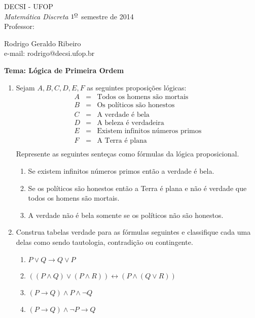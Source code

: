 \documentclass[11pt,a4paper]{report}
\begin{document}
 
 \hfill DECSI - UFOP \\
{\it Matem\'atica Discreta}
 \hfill $\mbox{1}^{\mbox{\underline{o}}}$ semestre de 2014 \\
Professor: \parbox[t]{14cm}{Rodrigo Geraldo Ribeiro \\
                     e-mail: rodrigo@decsi.ufop.br}
 
 \hfill {\bf Tema: L\'ogica de
  Primeira Ordem}
 
\vspace*{3mm}
\begin{enumerate}
   \item Sejam $A,B,C,D,E,F$ as seguintes proposi\c{c}\~oes l\'ogicas:
   \[
      \begin{array}{ccl}
        A & = & \text{Todos os homens s\~ao mortais}\\
        B & = & \text{Os pol\'iticos s\~ao honestos}\\
        C & = & \text{A verdade \'e bela}\\
        D & = & \text{A beleza \'e verdadeira}\\
        E & = & \text{Existem infinitos n\'umeros primos}\\
        F & = & \text{A Terra \'e plana}\\
      \end{array}
   \]
   Represente as seguintes sente\c{c}as como f\'ormulas da l\'ogica proposicional.
   \begin{enumerate}
      \item Se existem infinitos n\'umeros primos ent\~ao a verdade \'e bela.
      \item Se os pol\'iticos s\~ao honestos ent\~ao a Terra \'e plana e n\~ao \'e 
            verdade que todos os homens s\~ao mortais.
      \item A verdade n\~ao \'e bela somente se os pol\'iticos n\~ao s\~ao honestos.
   \end{enumerate}
   \item Construa tabelas verdade para as f\'ormulas seguintes e classifique cada uma delas
         como sendo tautologia, contradi\c{c}\~ao ou contingente.
   \begin{enumerate}
      \item $P\lor Q \rightarrow Q \lor P$
      \item $((P\land Q)\lor (P\land R))\leftrightarrow(P\land (Q\lor R))$
      \item $(P\rightarrow Q) \land P\land \neg Q$
      \item $(P \rightarrow Q)\land \neg P \rightarrow Q$

\end{enumerate}
\end{enumerate}
\end{document}
